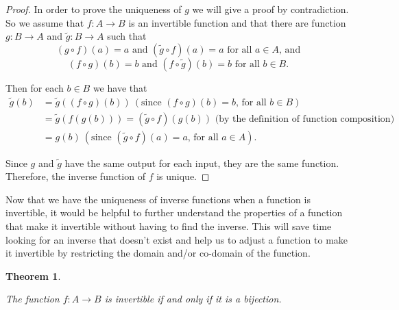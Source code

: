 \documentclass[
]{book}
\newtheorem{theorem}{Theorem}[chapter]
\theoremstyle{definition}
\theoremstyle{definition}
\theoremstyle{definition}
\theoremstyle{definition}
\theoremstyle{remark}
\begin{document}
\begin{proof}

In order to prove the uniqueness of \(g\) we will give a proof by contradiction. So we assume that \(f:A\rightarrow B\) is an invertible function and that there are function \(g:B\rightarrow A\) and \(\tilde{g}:B\rightarrow A\) such that
\[(g\circ f) (a)=a \mbox{ and } (\tilde{g}\circ f)(a) = a \mbox{ for all } a \in A \mbox{, and}\]
\[(f\circ g)(b)=b \mbox{ and } (f\circ \tilde{g})(b)=b \mbox{ for all } b\in B.\]

Then for each \(b\in B\) we have that
\begin{align*}
\tilde{g}(b) &= \tilde{g}\left( (f\circ g)(b)\right) \: (\mbox{since } (f\circ g)(b)=b \mbox{, for all } b \in B) \\
&= \tilde{g}\left(f(g(b))\right) = (\tilde{g} \circ f)(g(b)) \mbox{ (by the definition of function composition)} \\
&= g(b) \: (\mbox{since } (\tilde{g}\circ f)(a)=a \mbox{, for all } a\in A).
\end{align*}

Since \(g\) and \(\tilde{g}\) have the same output for each input, they are the same function. Therefore, the inverse function of \(f\) is unique.

\end{proof}

Now that we have the uniqueness of inverse functions when a function is invertible, it would be helpful to further understand the properties of a function that make it invertible without having to find the inverse. This will save time looking for an inverse that doesn't exist and help us to adjust a function to make it invertible by restricting the domain and/or co-domain of the function.

\begin{theorem}
\protect\hypertarget{thm:bijection}{}\label{thm:bijection}

The function \(f:A \rightarrow B\) is invertible if and only if it is a bijection.

\end{theorem}
\end{document}
